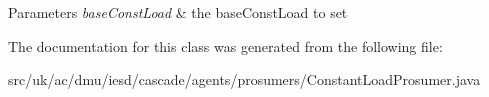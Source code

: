 \begin{DoxyParams}{Parameters}
{\em base\-Const\-Load} & the base\-Const\-Load to set \\
\hline
\end{DoxyParams}


The documentation for this class was generated from the following file\-:\begin{DoxyCompactItemize}
\item 
src/uk/ac/dmu/iesd/cascade/agents/prosumers/Constant\-Load\-Prosumer.\-java\end{DoxyCompactItemize}
